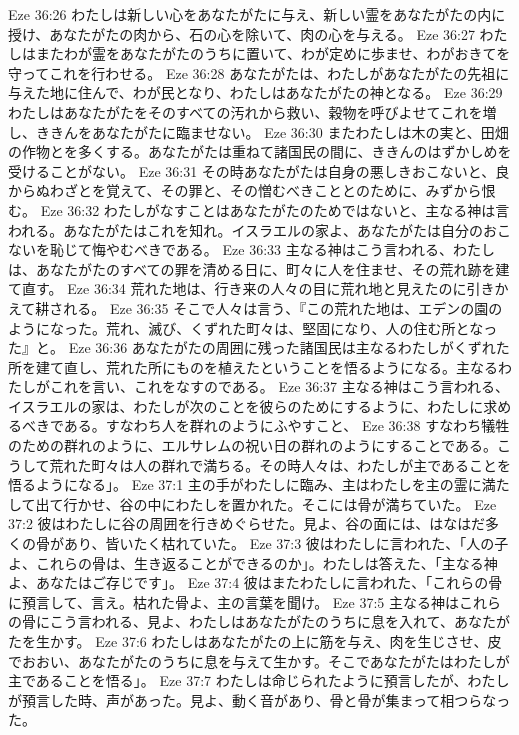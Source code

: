 Eze 36:26  わたしは新しい心をあなたがたに与え、新しい霊をあなたがたの内に授け、あなたがたの肉から、石の心を除いて、肉の心を与える。
Eze 36:27  わたしはまたわが霊をあなたがたのうちに置いて、わが定めに歩ませ、わがおきてを守ってこれを行わせる。
Eze 36:28  あなたがたは、わたしがあなたがたの先祖に与えた地に住んで、わが民となり、わたしはあなたがたの神となる。
Eze 36:29  わたしはあなたがたをそのすべての汚れから救い、穀物を呼びよせてこれを増し、ききんをあなたがたに臨ませない。
Eze 36:30  またわたしは木の実と、田畑の作物とを多くする。あなたがたは重ねて諸国民の間に、ききんのはずかしめを受けることがない。
Eze 36:31  その時あなたがたは自身の悪しきおこないと、良からぬわざとを覚えて、その罪と、その憎むべきこととのために、みずから恨む。
Eze 36:32  わたしがなすことはあなたがたのためではないと、主なる神は言われる。あなたがたはこれを知れ。イスラエルの家よ、あなたがたは自分のおこないを恥じて悔やむべきである。
Eze 36:33  主なる神はこう言われる、わたしは、あなたがたのすべての罪を清める日に、町々に人を住ませ、その荒れ跡を建て直す。
Eze 36:34  荒れた地は、行き来の人々の目に荒れ地と見えたのに引きかえて耕される。
Eze 36:35  そこで人々は言う、『この荒れた地は、エデンの園のようになった。荒れ、滅び、くずれた町々は、堅固になり、人の住む所となった』と。
Eze 36:36  あなたがたの周囲に残った諸国民は主なるわたしがくずれた所を建て直し、荒れた所にものを植えたということを悟るようになる。主なるわたしがこれを言い、これをなすのである。
Eze 36:37  主なる神はこう言われる、イスラエルの家は、わたしが次のことを彼らのためにするように、わたしに求めるべきである。すなわち人を群れのようにふやすこと、
Eze 36:38  すなわち犠牲のための群れのように、エルサレムの祝い日の群れのようにすることである。こうして荒れた町々は人の群れで満ちる。その時人々は、わたしが主であることを悟るようになる」。
Eze 37:1  主の手がわたしに臨み、主はわたしを主の霊に満たして出て行かせ、谷の中にわたしを置かれた。そこには骨が満ちていた。
Eze 37:2  彼はわたしに谷の周囲を行きめぐらせた。見よ、谷の面には、はなはだ多くの骨があり、皆いたく枯れていた。
Eze 37:3  彼はわたしに言われた、「人の子よ、これらの骨は、生き返ることができるのか」。わたしは答えた、「主なる神よ、あなたはご存じです」。
Eze 37:4  彼はまたわたしに言われた、「これらの骨に預言して、言え。枯れた骨よ、主の言葉を聞け。
Eze 37:5  主なる神はこれらの骨にこう言われる、見よ、わたしはあなたがたのうちに息を入れて、あなたがたを生かす。
Eze 37:6  わたしはあなたがたの上に筋を与え、肉を生じさせ、皮でおおい、あなたがたのうちに息を与えて生かす。そこであなたがたはわたしが主であることを悟る」。
Eze 37:7  わたしは命じられたように預言したが、わたしが預言した時、声があった。見よ、動く音があり、骨と骨が集まって相つらなった。
